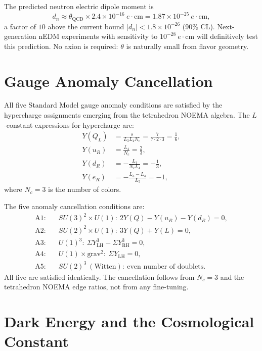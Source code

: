 \documentclass[aps,prd,reprint,twocolumn,showpacs,superscriptaddress]{revtex4-2}
\begin{document}
The predicted neutron electric dipole moment is
\begin{equation}
d_n \approx \theta_{\text{QCD}} \times 2.4 \times 10^{-16}\ e\cdot\text{cm}
      = 1.87 \times 10^{-25}\ e\cdot\text{cm},
\end{equation}
a factor of $10$ above the current bound $|d_n| < 1.8 \times 10^{-26}$
(90\% CL).  Next-generation nEDM experiments with sensitivity to
$10^{-28}\ e\cdot\text{cm}$ will definitively test this prediction.
No axion is required: $\theta$ is naturally small from flavor geometry.

\section{Gauge Anomaly Cancellation}
\label{sec:anomalies}

All five Standard Model gauge anomaly conditions are satisfied by the
hypercharge assignments emerging from the tetrahedron NOEMA algebra.
The $L$-constant expressions for hypercharge are:
\begin{align}
Y(Q_L) &= \frac{s}{L_3 L_4 N_c}
       = \frac{7}{7 \cdot 2 \cdot 3} = \frac16, \\
Y(u_R) &= \frac{L_4}{N_c} = \frac23, \\
Y(d_R) &= -\frac{L_4}{N_c L_4} = -\frac13, \\
Y(e_R) &= -\frac{L_3 - L_4}{L_5} = -1,
\end{align}
where $N_c = 3$ is the number of colors.

The five anomaly cancellation conditions are:
\begin{align}
\text{A1:}\quad & SU(3)^2 \times U(1):\ 2Y(Q) - Y(u_R) - Y(d_R) = 0,\\
\text{A2:}\quad & SU(2)^2 \times U(1):\ 3Y(Q) + Y(L) = 0,\\
\text{A3:}\quad & U(1)^3:\ \Sigma Y_{\text{LH}}^3 - \Sigma Y_{\text{RH}}^3 = 0,\\
\text{A4:}\quad & U(1) \times \text{grav}^2:\ \Sigma Y_{\text{LH}} = 0,\\
\text{A5:}\quad & SU(2)^3\ (\text{Witten}):\ \text{even number of doublets}.
\end{align}
All five are satisfied identically.  The cancellation follows from
$N_c = 3$ and the tetrahedron NOEMA edge ratios, not from any fine-tuning.

\section{Dark Energy and the Cosmological Constant}
\label{sec:de}
\end{document}
